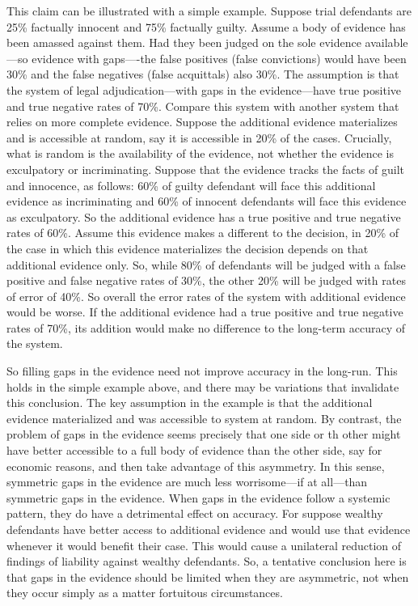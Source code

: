 \documentclass[
  10pt,
  dvipsnames,enabledeprecatedfontcommands]{scrartcl}
\begin{document}
This claim can be illustrated with a simple example. Suppose trial
defendants are 25\% factually innocent and 75\% factually guilty. Assume
a body of evidence has been amassed against them. Had they been judged
on the sole evidence available---so evidence with gaps----the false
positives (false convictions) would have been 30\% and the false
negatives (false acquittals) also 30\%. The assumption is that the
system of legal adjudication---with gaps in the evidence---have true
positive and true negative rates of 70\%. Compare this system with
another system that relies on more complete evidence. Suppose the
additional evidence materializes and is accessible at random, say it is
accessible in 20\% of the cases. Crucially, what is random is the
availability of the evidence, not whether the evidence is exculpatory or
incriminating. Suppose that the evidence tracks the facts of guilt and
innocence, as follows: 60\% of guilty defendant will face this
additional evidence as incriminating and 60\% of innocent defendants
will face this evidence as exculpatory. So the additional evidence has a
true positive and true negative rates of 60\%. Assume this evidence
makes a different to the decision, in 20\% of the case in which this
evidence materializes the decision depends on that additional evidence
only. So, while 80\% of defendants will be judged with a false positive
and false negative rates of 30\%, the other 20\% will be judged with
rates of error of 40\%. So overall the error rates of the system with
additional evidence would be worse. If the additional evidence had a
true positive and true negative rates of 70\%, its addition would make
no difference to the long-term accuracy of the system.

So filling gaps in the evidence need not improve accuracy in the
long-run. This holds in the simple example above, and there may be
variations that invalidate this conclusion. The key assumption in the
example is that the additional evidence materialized and was accessible
to system at random. By contrast, the problem of gaps in the evidence
seems precisely that one side or th other might have better accessible
to a full body of evidence than the other side, say for economic
reasons, and then take advantage of this asymmetry. In this sense,
symmetric gaps in the evidence are much less worrisome---if at
all---than symmetric gaps in the evidence. When gaps in the evidence
follow a systemic pattern, they do have a detrimental effect on
accuracy. For suppose wealthy defendants have better access to
additional evidence and would use that evidence whenever it would
benefit their case. This would cause a unilateral reduction of findings
of liability against wealthy defendants. So, a tentative conclusion here
is that gaps in the evidence should be limited when they are asymmetric,
not when they occur simply as a matter fortuitous circumstances.
\end{document}
